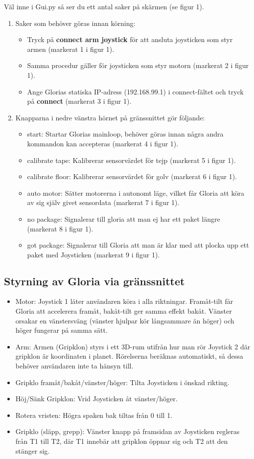 Väl inne i Gui.py så ser du ett antal saker på skärmen (se figur 1).
\begin{enumerate}
	\item Saker som behöver göras innan körning:
	\begin{itemize}
		\item Tryck på \textbf{connect arm joystick} för att ansluta joysticken som styr armen (markerat 1 i figur 1).
		\item Samma procedur gäller för joysticken som styr motorn (markerat 2 i figur 1).
		\item Ange Glorias statiska IP-adress (192.168.99.1) i connect-fältet och tryck på \textbf{connect} (markerat 3 i figur 1).
	\end{itemize}
	\item Knapparna i nedre vänstra hörnet på gränssnittet gör följande:
	\begin{itemize}
		\item start: Startar Glorias mainloop, behöver göras innan några andra kommandon kan accepteras (markerat 4 i figur 1).
		\item calibrate tape: Kalibrerar sensorvärdet för tejp (markerat 5 i figur 1).
		\item calibrate floor: Kalibrerar sensorvärdet för golv (markerat 6 i figur 1).
		\item auto motor: Sätter motorerna i autonomt läge, vilket får Gloria att köra av sig själv givet sensordata (markerat 7 i figur 1).		
		\item no package: Signalerar till gloria att man ej har ett paket längre (markerat 8 i figur 1).
		\item got package: Signalerar till Gloria att man är klar med att plocka upp ett paket med Joysticken (markerat 9 i figur 1).
	\end{itemize}
\end{enumerate}
\subsection{Styrning av Gloria via gränssnittet}
	\begin{itemize}	
		\item Motor: Joystick 1 låter användaren köra i alla riktningar. Framåt-tilt får Gloria att accelerera framåt, bakåt-tilt ger samma effekt bakåt. Vänster orsakar en vänstersväng (vänster hjulpar kör långsammare än höger) och höger fungerar på samma sätt.
		\item Arm: Armen (Gripklon) styrs i ett 3D-rum utifrån hur man rör Joystick 2 där gripklon är koordinaten i planet. Rörelserna beräknas automatiskt, så dessa behöver användaren inte ta hänsyn till. 
		\item Gripklo framåt/bakåt/vänster/höger: Tilta Joysticken i önskad rikting.
		\item Höj/Sänk Gripklon: Vrid Joysticken åt vänster/höger.
		\item Rotera vristen: Högra spaken bak tiltas från 0 till 1.
		\item Gripklo (släpp, grepp): Vänster knapp på framsidan av Joysticken regleras från T1 till T2, där T1 innebär att gripklon öppnar sig och T2 att den stänger sig.
	\end{itemize}
